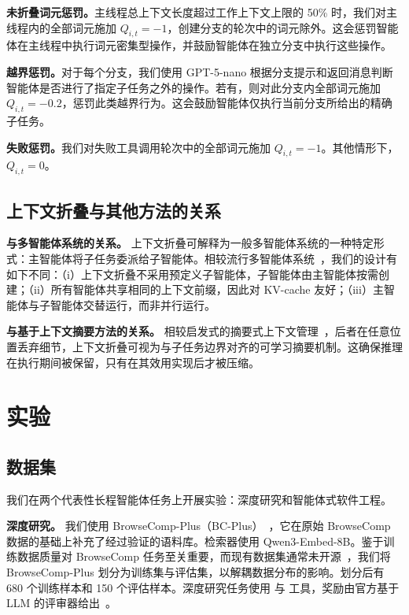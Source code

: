 \noindent \textbf{未折叠词元惩罚。}主线程总上下文长度超过工作上下文上限的 50\% 时，我们对主线程内的全部词元施加 $Q_{i,t}=-1$，创建分支的轮次中的词元除外。这会惩罚智能体在主线程中执行词元密集型操作，并鼓励智能体在独立分支中执行这些操作。

\noindent \textbf{越界惩罚。}对于每个分支，我们使用 GPT-5-nano 根据分支提示和返回消息判断智能体是否进行了指定子任务之外的操作。若有，则对此分支内全部词元施加 $Q_{i,t}=-0.2$，惩罚此类越界行为。这会鼓励智能体仅执行当前分支所给出的精确子任务。

\textbf{失败惩罚。}我们对失败工具调用轮次中的全部词元施加 $Q_{i,t}=-1$。其他情形下，$Q_{i,t}=0$。

\subsection{上下文折叠与其他方法的关系}
\textbf{与多智能体系统的关系。}
上下文折叠可解释为一般多智能体系统的一种特定形式：主智能体将子任务委派给子智能体。相较流行多智能体系统~\citep{Hadfield2025}，我们的设计有如下不同：（i）上下文折叠不采用预定义子智能体，子智能体由主智能体按需创建；（ii）所有智能体共享相同的上下文前缀，因此对 KV-cache 友好；（iii）主智能体与子智能体交替运行，而非并行运行。

\textbf{与基于上下文摘要方法的关系。}
相较启发式的摘要式上下文管理~\citep{Yu2025MemAgentRL,OpenAI2025a}，后者在任意位置丢弃细节，上下文折叠可视为与子任务边界对齐的可学习摘要机制。这确保推理在执行期间被保留，只有在其效用实现后才被压缩。

\section{实验}

\subsection{数据集}
我们在两个代表性长程智能体任务上开展实验：深度研究和智能体式软件工程。

\noindent \textbf{深度研究。}
我们使用 BrowseComp-Plus（BC-Plus）~\citep{Chen2025BrowseCompPlusAM}，它在原始 BrowseComp 数据的基础上补充了经过验证的语料库。检索器使用 Qwen3-Embed-8B。鉴于训练数据质量对 BrowseComp 任务至关重要，而现有数据集通常未开源~\citep{Qiao2025WebResearcherUU,Li2025WebSailorV2BT}，我们将 BrowseComp-Plus 划分为训练集与评估集，以解耦数据分布的影响。划分后有 680 个训练样本和 150 个评估样本。深度研究任务使用  与  工具，奖励由官方基于 LLM 的评审器给出~\citep{Chen2025BrowseCompPlusAM}。

